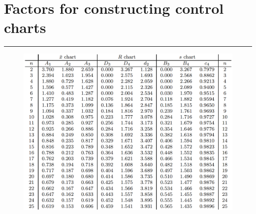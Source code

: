\section{Factors for constructing control charts}
\noindent\rule[\linienAbstand]{\linewidth}{\linienDickeDick}
\begin{figure}[H]
  \centering
  \includegraphics[width=\linewidth]{Pics/T.15.png}
\end{figure}
